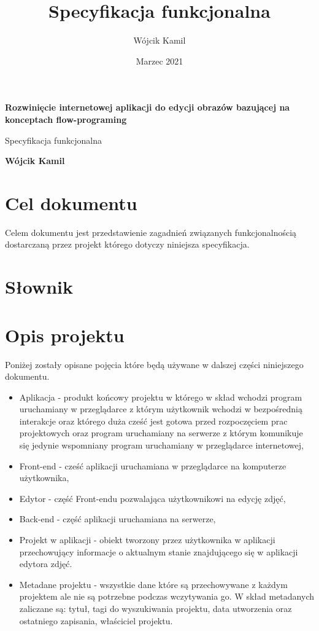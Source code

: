 \documentclass{article}
\title{Specyfikacja funkcjonalna}
\author{Wójcik Kamil}
\date{Marzec 2021}
\begin{document}
\begin{titlepage}
    \begin{center}
    

    \Huge
    \textbf{Rozwinięcie internetowej aplikacji do edycji obrazów bazującej na konceptach flow-programing}
            
    \vspace{0.5cm}
    \LARGE
    Specyfikacja funkcjonalna
    \vspace{1.5cm}
            
    \textbf{Wójcik Kamil}
    
    \end{center}
\end{titlepage}

\tableofcontents
\newpage

\section{Cel dokumentu}

Celem dokumentu jest przedstawienie zagadnień związanych funkcjonalnością dostarczaną przez projekt którego dotyczy niniejsza specyfikacja.
\section{Słownik}

\section{Opis projektu}

Poniżej zostały opisane pojęcia które będą używane w dalszej części niniejszego dokumentu.
\begin{itemize}
    \item Aplikacja - produkt końcowy projektu w którego w skład wchodzi program uruchamiany w przeglądarce z którym użytkownik wchodzi w bezpośrednią interakcje oraz którego duża cześć jest gotowa przed rozpoczęciem prac projektowych  oraz program uruchamiany na serwerze z którym komunikuje się jedynie wspomniany program uruchamiany w przeglądarce internetowej,
    \item Front-end - cześć aplikacji uruchamiana w przeglądarce na komputerze użytkownika,
    \item Edytor - część Front-endu pozwalająca użytkownikowi na edycję zdjęć,
    \item Back-end - część aplikacji uruchamiana na serwerze,
    \item Projekt w aplikacji - obiekt tworzony przez użytkownika w aplikacji przechowujący informacje o aktualnym stanie znajdującego się w aplikacji edytora zdjęć. 
    \item Metadane projektu - wszystkie dane które są przechowywane z każdym projektem ale nie są potrzebne podczas wczytywania go. W skład metadanych zaliczane są: tytuł, tagi do wyszukiwania projektu, data utworzenia oraz ostatniego zapisania, właściciel projektu.

\end{itemize}
\end{document}
